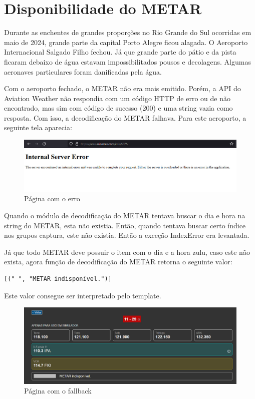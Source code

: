 \chapter{Disponibilidade do METAR}

Durante as enchentes de grandes proporções no Rio Grande do Sul ocorridas em maio 
de 2024, grande parte da capital Porto Alegre ficou alagada. O Aeroporto 
Internacional Salgado Filho fechou. Já que grande parte do pátio e da pista 
ficaram debaixo de água estavam impossibilitados pousos e decolagens. Algumas 
aeronaves particulares foram danificadas pela água.

Com o aeroporto fechado, o METAR não era mais emitido. Porém, a API do Aviation 
Weather não respondia com um código HTTP de erro ou de não encontrado, mas sim 
com código de sucesso (200) e uma string vazia como resposta. Com isso, a decodificação
do METAR falhava. Para este aeroporto, a seguinte tela aparecia:

\begin{figure}[ht]
    \begin{center}
    \includegraphics[width=400pt]{img/sbpa-erro.jpeg}
    \caption{Página com o erro}
    \label{fig:sbpa-erro}
    \end{center}
\end{figure}

Quando o módulo de decodificação do METAR tentava buscar o dia e hora na string 
do METAR, esta não existia. Então, quando tentava buscar certo índice nos grupos 
captura, este não existia. Então a exceção IndexError era levantada.

Já que todo METAR deve possuir o item com o dia e a hora zulu, caso este não 
exista, agora função de decodificação do METAR retorna o seguinte valor:

\begin{verbatim}
[(" ", "METAR indisponível.")]
\end{verbatim}

Este valor consegue ser interpretado pelo template.

\begin{figure}[ht]
    \begin{center}
    \includegraphics[width=400pt]{img/sbpa.jpeg}
    \caption{Página com o fallback}
    \label{fig:sbpa}
    \end{center}
\end{figure}
